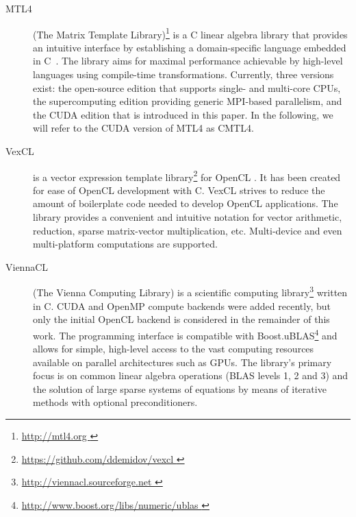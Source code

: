 \documentclass[final]{siamltex}
\newcommand{\addpp}[1]{{#1\nolinebreak[4]\hspace{-.05em}\raisebox{.4ex}{\tiny\bf ++}}\xspace}
\newcommand{\Cpp}{\addpp{C}}
\begin{document}
\begin{description}
    \item[MTL4] (The Matrix Template Library)\footnote{ \href{ http://mtl4.org }{
        http://mtl4.org }} is a \Cpp linear algebra library that provides
        an intuitive interface by establishing a domain-specific language
        embedded in \Cpp~\cite{pg_ccgrid12}.
        The library aims for maximal performance achievable by high-level languages
        using compile-time transformations.
        Currently, three versions exist:
        the open-source edition that supports single- and multi-core
        CPUs, the supercomputing edition providing generic MPI-based
        parallelism, and the CUDA edition that is introduced in this
        paper. In the following, we will refer to the CUDA version of
        MTL4 as CMTL4.
    \item[VexCL] is a vector expression template
        library\footnote{ \href{ https://github.com/ddemidov/vexcl }{
        https://github.com/ddemidov/vexcl }} for OpenCL \cite{VexCLRef}. It has
        been created for ease of OpenCL development with \Cpp.  VexCL strives to
        reduce the amount of boilerplate code needed to develop OpenCL
        applications. The library provides a convenient and intuitive notation
        for vector arithmetic, reduction, sparse matrix-vector multiplication,
        etc.  Multi-device and even multi-platform computations are supported.
    \item[ViennaCL] (The Vienna Computing Library) is a scientific computing
        library\footnote{ \href{ http://viennacl.sourceforge.net }{
        http://viennacl.sourceforge.net }} written in \Cpp \cite{ViennaCLRef}.
        CUDA and OpenMP compute backends were added recently, but
        only the initial OpenCL backend is considered in the remainder of this work.
        The programming interface is compatible with
        Boost.uBLAS\footnote{ \href{ http://www.boost.org/libs/numeric/ublas }
        { http://www.boost.org/libs/numeric/ublas } }
        and allows for simple, high-level access to the vast
        computing resources available on parallel architectures such as GPUs.
        The library's primary focus is on common linear algebra operations (BLAS
        levels 1, 2 and 3) and the solution of large sparse systems of equations by
        means of iterative methods with optional preconditioners.
\end{description}
\end{document}

